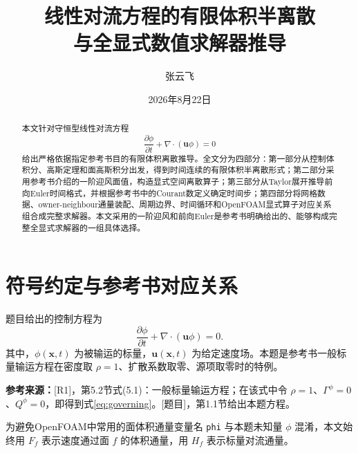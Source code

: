\documentclass[UTF8,12pt,a4paper]{ctexart}
\title{\bfseries 线性对流方程的有限体积半离散\\与全显式数值求解器推导}
\author{张云飞}
\date{2026年8月22日}
\numberwithin{equation}{section}
\newcommand{\Rone}{\textnormal{[R1]}}
\newcommand{\Task}{\textnormal{[题目]}}
\newcommand{\source}[1]{%
  \par\smallskip
  \noindent\colorbox{sourcebg}{%
    \parbox{0.955\linewidth}{\footnotesize\color{sourcegray}\textbf{参考来源：}#1}%
  }
  \par\smallskip
}
\begin{document}
\maketitle

\begin{abstract}
本文针对守恒型线性对流方程
\[
  \frac{\partial\phi}{\partial t}+\nabla\cdot(\bm u\phi)=0
\]
给出严格依据指定参考书目的有限体积离散推导。全文分为四部分：第一部分从控制体积分、高斯定理和面高斯积分出发，得到时间连续的有限体积半离散形式；第二部分采用参考书介绍的一阶迎风面值，构造显式空间离散算子；第三部分从Taylor展开推导前向Euler时间格式，并根据参考书中的Courant数定义确定时间步；第四部分将网格数据、owner-neighbour通量装配、周期边界、时间循环和OpenFOAM显式算子对应关系组合成完整求解器。本文采用的一阶迎风和前向Euler是参考书明确给出的、能够构成完整全显式求解器的一组具体选择。
\end{abstract}

\tableofcontents
\newpage

\section*{符号约定与参考书对应关系}

题目给出的控制方程为
\begin{equation}
  \frac{\partial\phi}{\partial t}
  +\nabla\cdot(\bm u\phi)=0.
  \label{eq:governing}
\end{equation}
其中，$\phi(\bm x,t)$ 为被输运的标量，$\bm u(\bm x,t)$ 为给定速度场。本题是参考书一般标量输运方程在密度取 $\rho=1$、扩散系数取零、源项取零时的特例。

\source{\Rone，第5.2节式(5.1)：一般标量输运方程；在该式中令 $\rho=1$、$\Gamma^\phi=0$、$Q^\phi=0$，即得到式\eqref{eq:governing}。\Task，第1.1节给出本题方程。}

为避免OpenFOAM中常用的面体积通量变量名 \texttt{phi} 与本题未知量 $\phi$ 混淆，本文始终用 $F_f$ 表示速度通过面 $f$ 的体积通量，用 $H_f$ 表示标量对流通量。
\end{document}
